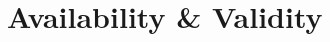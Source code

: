 \newcommand{\blobB}{\ensuremath{\bar{B}}} %
\newcommand{\PoVB}{\ensuremath{PoV_B}} %
\newcommand{\paraValidSet}{\ensuremath{\mathcal{V}_\rho}} %


\chapter{Availability \& Validity}











